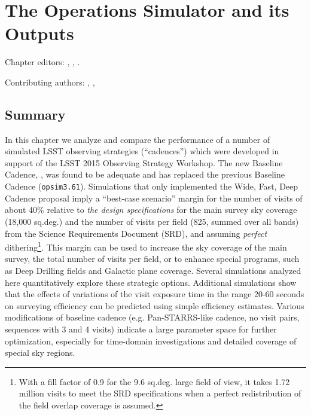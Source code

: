 
\chapter[Some Example Observing Strategies]{The Operations Simulator and its Outputs}
\def\chpname{cadexp}\label{chp:\chpname}

Chapter editors:
,
,
.

Contributing authors:
,
,


\section*{Summary}

In this chapter
we analyze and compare the performance of a number of simulated LSST
observing strategies (``cadences'')
which were developed in support of the LSST 2015 Observing
Strategy Workshop.  The new Baseline Cadence,
, was found to be adequate and has replaced the previous
Baseline Cadence (\texttt{opsim3.61}).
Simulations that only implemented the Wide, Fast, Deep Cadence proposal imply a
``best-case scenario'' margin for the number of visits of about 40\% relative to {\it the design
specifications} for the main survey sky coverage (18,000 sq.deg.) and the number of
visits per field (825, summed over all bands) from the Science Requirements Document (SRD),
and assuming {\it perfect} dithering\footnote{With a fill factor of 0.9 for the 9.6 sq.deg. large
field of view, it takes 1.72 million visits to meet the SRD specifications when a perfect
redistribution of the field overlap coverage is assumed.}.
This margin can be used to increase the sky coverage of the main survey, the total
number of visits per field, or to enhance special programs, such as
Deep Drilling fields and Galactic plane coverage. Several  simulations
analyzed here quantitatively explore these strategic options.
Additional simulations show that the effects of variations of the
visit exposure time in the  range 20-60 seconds on surveying
efficiency can be predicted using simple efficiency estimates. Various
modifications of baseline cadence (e.g. Pan-STARRS-like cadence,  no
visit pairs, sequences with 3 and 4 visits) indicate a large parameter
space for further optimization, especially for time-domain
investigations and detailed coverage of special sky regions.

